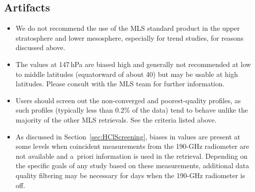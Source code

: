 \subsection{Artifacts}
\begin{itemize}
  \item We do not recommend the use of the MLS  standard product in the upper stratosphere and lower mesosphere, especially for trend studies, for reasons discussed above.
  
  \item The  values at 147\,hPa are biased high and generally not recommended at low to middle latitudes (equatorward of about 40\degsym) but may be usable at high latitudes. Please consult with the MLS team for further information.
  
  \item Users should screen out the non-converged and poorest-quality  profiles, as such profiles (typically less than 0.2\% of the data) tend to behave unlike the majority of the other MLS retrievals. See the criteria listed above.
  
  \item As discussed in Section~\ref{sec:HClScreening}, biases in  values are present at some levels when coincident measurements from the \mbox{190-GHz} radiometer are not available and  a~priori information is used in the  retrieval. Depending on the specific goals of any study based on these measurements, additional  data quality filtering may be necessary for days when the \mbox{190-GHz} radiometer is off.
\end{itemize}


